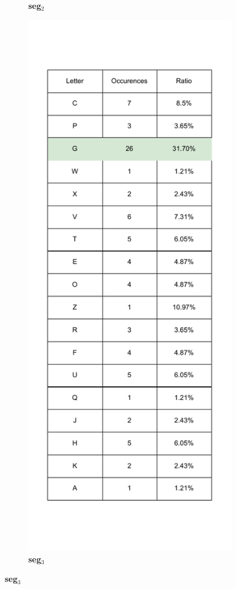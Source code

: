 \begin{figure}[htb]
\begin{subfigure}[t]{0.32\textwidth}
    \caption*{\textbf{seg\(_2\)}}
  \end{subfigure}%
  \hfill
  \begin{subfigure}[t]{0.32\textwidth}
    \centering
    \includegraphics[height=0.45\textheight]{Chapters/Diagram/Crypto/seg_3.drawio.pdf}
    \caption*{\textbf{seg\(_3\)}}
  \end{subfigure}
\end{figure}


